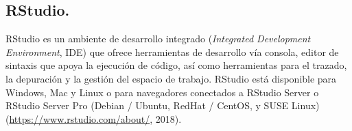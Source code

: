 \subsection{RStudio.}

RStudio es un ambiente de desarrollo integrado (\textit{Integrated Development Environment}, IDE) que ofrece herramientas de desarrollo vía consola, editor de sintaxis que apoya la ejecución de código, así como herramientas para el trazado, la depuración y la gestión del espacio de trabajo.  RStudio está disponible para Windows, Mac y Linux o para navegadores conectados a RStudio Server o RStudio Server Pro (Debian / Ubuntu, RedHat / CentOS, y SUSE Linux) (\url{https://www.rstudio.com/about/}, 2018).
 

